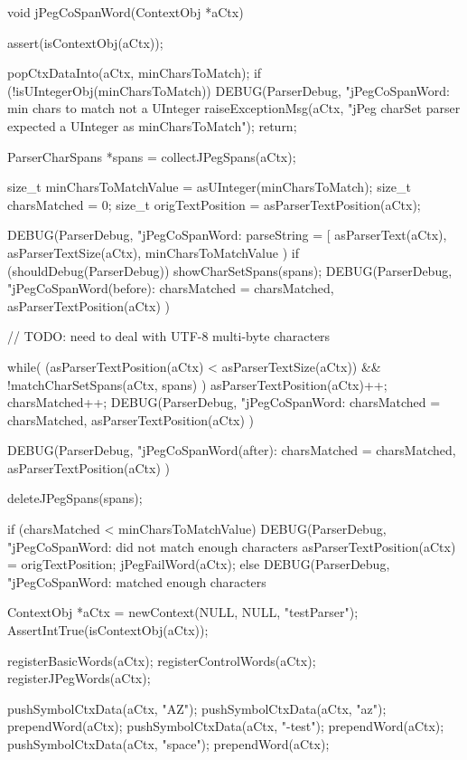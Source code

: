 \startCCode
void jPegCoSpanWord(ContextObj *aCtx) {
  assert(isContextObj(aCtx));
  
  popCtxDataInto(aCtx, minCharsToMatch);
  if (!isUIntegerObj(minCharsToMatch)) {
    DEBUG(ParserDebug,
      "jPegCoSpanWord: min chars to match not a UInteger%
    raiseExceptionMsg(aCtx,
      "jPeg charSet parser expected a UInteger as minCharsToMatch");
    return;
  }
  
  ParserCharSpans *spans = collectJPegSpans(aCtx);
  
  size_t minCharsToMatchValue = asUInteger(minCharsToMatch);
  size_t charsMatched         = 0;
  size_t origTextPosition     = asParserTextPosition(aCtx);
  
  DEBUG(ParserDebug,
    "jPegCoSpanWord: parseString = [%
    asParserText(aCtx), asParserTextSize(aCtx), minCharsToMatchValue
  )
  if (shouldDebug(ParserDebug)) showCharSetSpans(spans);
  DEBUG(ParserDebug,
    "jPegCoSpanWord(before): charsMatched = %
    charsMatched, asParserTextPosition(aCtx)
  )
 
  // TODO: need to deal with UTF-8 multi-byte characters
  
  while(
    (asParserTextPosition(aCtx) < asParserTextSize(aCtx)) &&
    !matchCharSetSpans(aCtx, spans)
  ) {
    asParserTextPosition(aCtx)++;
    charsMatched++;
    DEBUG(ParserDebug,
      "jPegCoSpanWord: charsMatched = %
      charsMatched, asParserTextPosition(aCtx)
    )
  }

  DEBUG(ParserDebug,
    "jPegCoSpanWord(after): charsMatched = %
    charsMatched, asParserTextPosition(aCtx)
  )

  deleteJPegSpans(spans);

  if (charsMatched < minCharsToMatchValue) {
    DEBUG(ParserDebug,
      "jPegCoSpanWord: did not match enough characters%
    asParserTextPosition(aCtx) = origTextPosition;
    jPegFailWord(aCtx);
  } else {
    DEBUG(ParserDebug, 
      "jPegCoSpanWord: matched enough characters%
  }
}
\stopCCode


\startCTest
  ContextObj *aCtx = newContext(NULL, NULL, "testParser");
  AssertIntTrue(isContextObj(aCtx));
  
  registerBasicWords(aCtx);
  registerControlWords(aCtx);
  registerJPegWords(aCtx);
  
  pushSymbolCtxData(aCtx, "AZ");
  pushSymbolCtxData(aCtx, "az");
  prependWord(aCtx);
  pushSymbolCtxData(aCtx, "-test");
  prependWord(aCtx);
  pushSymbolCtxData(aCtx, "space");
  prependWord(aCtx);
  
